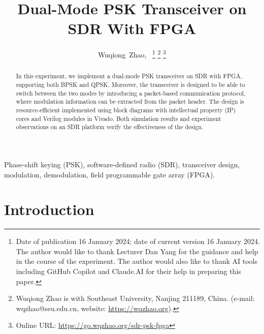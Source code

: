 \documentclass[journal,twoside]{IEEEtran}
\begin{document}
  \title{Dual-Mode PSK Transceiver on SDR With FPGA}

  \author{%
    Wuqiong~Zhao{\hspace{.1em}\textsuperscript{}},~
    \thanks{Date of publication 16 January 2024; date of current version 16 January 2024.
      The author would like to thank Lecturer Dan Yang for the guidance and help in the course of the experiment.
      The author would also like to thank AI tools including GitHub Copilot and Claude.AI for their help in preparing this paper.}
    \thanks{Wuqiong Zhao is with Southeast University, Nanjing 211189, China. (e-mail: wqzhao@seu.edu.cn, website: \url{https://wqzhao.org}).}
    \thanks{Online URL: \url{https://go.wqzhao.org/sdr-psk-fpga}}
  }

  \maketitle

  \begin{abstract}
    In this experiment, we implement a dual-mode PSK transceiver on SDR with FPGA,
    supporting both BPSK and QPSK.
    Moreover, the transceiver is designed to be able to switch between the two modes by introducing a packet-based communication protocol,
    where modulation information can be extracted from the packet header.
    The design is resource-efficient implemented using block diagrams with intellectual property (IP) cores and Verilog modules in Vivado.
    Both simulation results and experiment observations on an SDR platform verify the effectiveness of the design.
  \end{abstract}
  \begin{IEEEkeywords}
    Phase-shift keying (PSK), software-defined radio (SDR), transceiver design, modulation, demodulation, field programmable gate array (FPGA).
  \end{IEEEkeywords}

  \section{Introduction}
\end{document}
